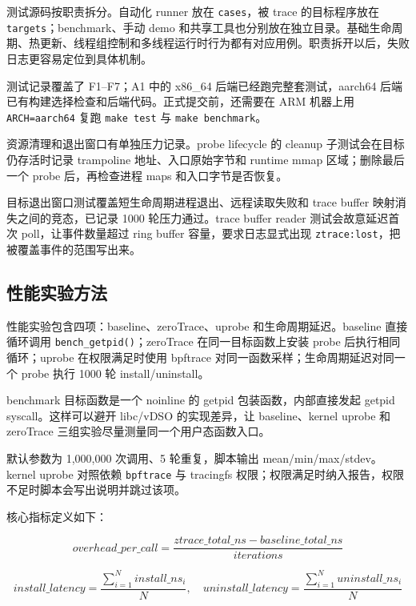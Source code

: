\documentclass[UTF8,a4paper,11pt,fontset=fandol]{ctexart}
\newcommand{\code}[1]{\texttt{#1}}
\begin{document}
测试源码按职责拆分。自动化 runner 放在 \code{cases}，被 trace 的目标程序放在 \code{targets}；benchmark、手动 demo 和共享工具也分别放在独立目录。基础生命周期、热更新、线程组控制和多线程运行时行为都有对应用例。职责拆开以后，失败日志更容易定位到具体机制。

测试记录覆盖了 F1--F7；A1 中的 x86\_64 后端已经跑完整套测试，aarch64 后端已有构建选择检查和后端代码。正式提交前，还需要在 ARM 机器上用 \code{ARCH=aarch64} 复跑 \code{make test} 与 \code{make benchmark}。

资源清理和退出窗口有单独压力记录。probe lifecycle 的 cleanup 子测试会在目标仍存活时记录 trampoline 地址、入口原始字节和 runtime mmap 区域；删除最后一个 probe 后，再检查进程 maps 和入口字节是否恢复。

目标退出窗口测试覆盖短生命周期进程退出、远程读取失败和 trace buffer 映射消失之间的竞态，已记录 1000 轮压力通过。trace buffer reader 测试会故意延迟首次 poll，让事件数量超过 ring buffer 容量，要求日志显式出现 \code{ztrace:lost}，把被覆盖事件的范围写出来。

\subsection{性能实验方法}

性能实验包含四项：baseline、zeroTrace、uprobe 和生命周期延迟。baseline 直接循环调用 \code{bench\_getpid()}；zeroTrace 在同一目标函数上安装 probe 后执行相同循环；uprobe 在权限满足时使用 bpftrace 对同一函数采样；生命周期延迟对同一个 probe 执行 1000 轮 install/uninstall。

benchmark 目标函数是一个 noinline 的 getpid 包装函数，内部直接发起 getpid syscall。这样可以避开 libc/vDSO 的实现差异，让 baseline、kernel uprobe 和 zeroTrace 三组实验尽量测量同一个用户态函数入口。

默认参数为 1,000,000 次调用、5 轮重复，脚本输出 mean/min/max/stdev。kernel uprobe 对照依赖 \code{bpftrace} 与 tracingfs 权限；权限满足时纳入报告，权限不足时脚本会写出说明并跳过该项。

核心指标定义如下：

\begin{equation}
  overhead\_per\_call =
  \frac{ztrace\_total\_ns - baseline\_total\_ns}{iterations}
\end{equation}

\begin{equation}
  install\_latency =
  \frac{\sum_{i=1}^{N} install\_ns_i}{N}, \quad
  uninstall\_latency =
  \frac{\sum_{i=1}^{N} uninstall\_ns_i}{N}
\end{equation}
\end{document}
